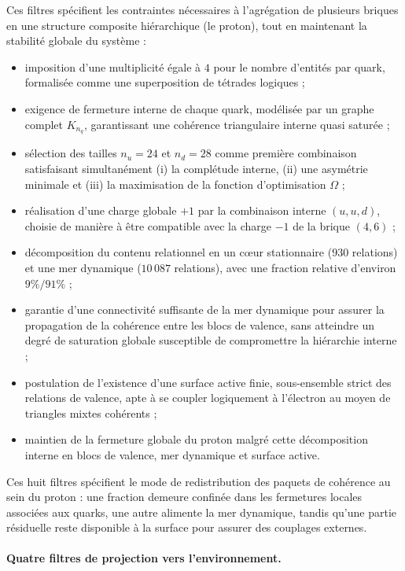 \documentclass[11pt,a4paper]{article}
\begin{document}
Ces filtres spécifient les contraintes nécessaires à l’agrégation de plusieurs briques en une structure composite hiérarchique (le proton), tout en maintenant la stabilité globale du système :
\begin{itemize}
  \item imposition d’une multiplicité égale à \(4\) pour le nombre d’entités par quark, formalisée comme une superposition de tétrades logiques ;
  \item exigence de fermeture interne de chaque quark, modélisée par un graphe complet \(K_{n_q}\), garantissant une cohérence triangulaire interne quasi saturée ;
  \item sélection des tailles \(n_u = 24\) et \(n_d = 28\) comme première combinaison satisfaisant simultanément (i) la complétude interne, (ii) une asymétrie minimale et (iii) la maximisation de la fonction d’optimisation \(\Omega\) ;
  \item réalisation d’une charge globale \(+1\) par la combinaison interne \((u,u,d)\), choisie de manière à être compatible avec la charge \(-1\) de la brique \((4,6)\) ;
  \item décomposition du contenu relationnel en un cœur stationnaire (\(930\) relations) et une mer dynamique (\(10\,087\) relations), avec une fraction relative d’environ \(9\%/91\%\) ;
  \item garantie d’une connectivité suffisante de la mer dynamique pour assurer la propagation de la cohérence entre les blocs de valence, sans atteindre un degré de saturation globale susceptible de compromettre la hiérarchie interne ;
  \item postulation de l’existence d’une surface active finie, sous-ensemble strict des relations de valence, apte à se coupler logiquement à l’électron au moyen de triangles mixtes cohérents ;
  \item maintien de la fermeture globale du proton malgré cette décomposition interne en blocs de valence, mer dynamique et surface active.
\end{itemize}

Ces huit filtres spécifient le mode de redistribution des paquets de cohérence au sein du proton : une fraction demeure confinée dans les fermetures locales associées aux quarks, une autre alimente la mer dynamique, tandis qu’une partie résiduelle reste disponible à la surface pour assurer des couplages externes.

\paragraph{Quatre filtres de projection vers l’environnement.}
\end{document}
